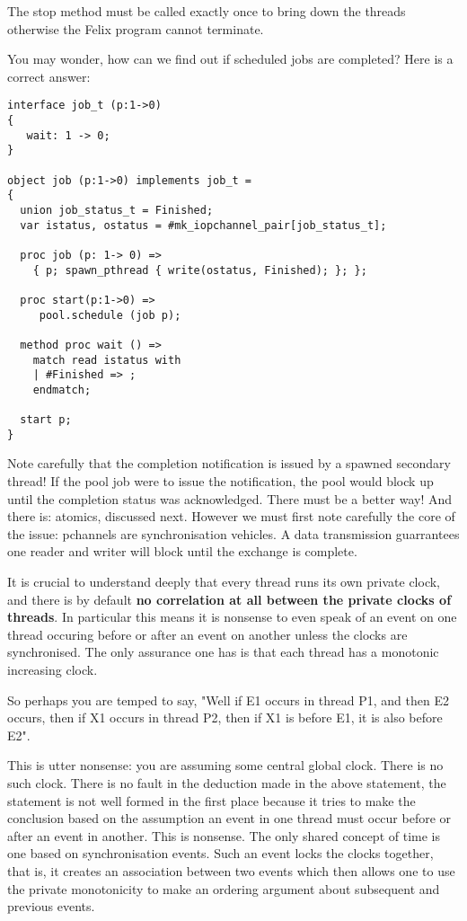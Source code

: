 \documentclass[oneside]{book}
\begin{document}
The stop method must be called exactly once to bring down the threads
otherwise the Felix program cannot terminate.

You may wonder, how can we find out if scheduled jobs are 
completed? Here is a correct answer:

\begin{verbatim}
interface job_t (p:1->0) 
{
   wait: 1 -> 0;
}

object job (p:1->0) implements job_t =
{
  union job_status_t = Finished;
  var istatus, ostatus = #mk_iopchannel_pair[job_status_t];

  proc job (p: 1-> 0) =>
    { p; spawn_pthread { write(ostatus, Finished); }; };

  proc start(p:1->0) =>
     pool.schedule (job p);

  method proc wait () =>
    match read istatus with
    | #Finished => ;
    endmatch;

  start p;
} 
\end{verbatim}

Note carefully that the completion notification is issued
by a spawned secondary thread! If the pool job were to 
issue the notification, the pool would block up until
the completion status was acknowledged. There must be a better
way! And there is: atomics, discussed next. However we must
first note carefully the core of the issue: pchannels are
synchronisation vehicles. A data transmission guarrantees
one reader and writer will block until the exchange
is complete. 

It is crucial to understand deeply that
every thread runs its own private clock,
and there is by default {\bf no correlation at all
between the private clocks of threads}. In particular
this means it is nonsense to even speak of an event on
one thread occuring before or after an event on another
unless the clocks are synchronised. The only assurance
one has is that each thread has a monotonic increasing
clock.

So perhaps you are temped to say, "Well if E1 occurs in
thread P1, and then E2 occurs, then if X1 occurs in 
thread P2, then if X1 is before E1, it is also before
E2".

This is utter nonsense: you are assuming some central
global clock. There is no such clock. There is no fault
in the deduction made in the above statement, the statement
is not well formed in the first place because it tries
to make the conclusion based on the assumption an event
in one thread must occur before or after an event in another.
This is nonsense. The only shared concept of time is one
based on synchronisation events. Such an event locks the
clocks together, that is, it creates an association between
two events which then allows one to use the private monotonicity
to make an ordering argument about subsequent and previous events.
\end{document}
